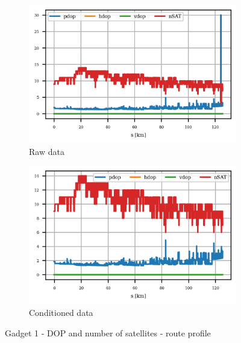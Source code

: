 \documentclass{article}
\begin{document}
			\begin{figure}[h]
		    	\centering
		     	\begin{subfigure}[b]{0.45\textwidth}
		      		\centering
		      	   \includegraphics[width=\textwidth]{Route/raw_dop_U-blox M8N.png}
		      	   \caption{Raw data}
		      	   \label{fig:Gadget1_raw_dop}
		     	\end{subfigure}
		     	\begin{subfigure}[b]{0.45\textwidth}
		      	   \centering
		      	   \includegraphics[width=\textwidth]{Route/cond_dop_U-blox M8N.png}
		      	   \caption{Conditioned data}
		      	   \label{fig:Gadget1_cond_dop}
		     	\end{subfigure}
		      \caption{Gadget 1 - DOP and number of satellites - route profile}
		      \label{fig:Gadget1_dop}
			\end{figure}
\end{document}
